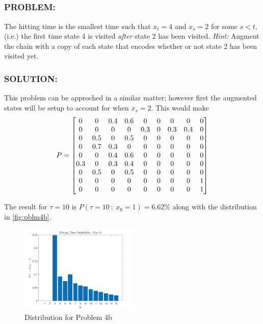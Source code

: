 \documentclass[]{article}
\newcommand{\Problem}{\subsubsection*{\textbf{PROBLEM:}}}
\newcommand{\Solution}{\subsubsection*{\textbf{SOLUTION:}}}
\newcommand{\st}{\ : \ }
\begin{document}
\subsection{}
\Problem
The hitting time is the smallest time such that $x_t = 4$ and $x_s = 2$ for some $s < t$, (i.e.) the first time state 4 is visited \emph{after} state 2 has been visited.
\emph{Hint:} Augment the chain with a copy of each state that encodes whether or not state 2 has been visited yet.
\Solution
This problem can be approched in a similar matter; however first the augmented states will be setup to account for when $x_s = 2$.
This would make \[
    P = \mqty[
        0   & 0   & 0.4 & 0.6 & 0   & 0 & 0   & 0   & 0 \\
        0   & 0   & 0   & 0   & 0.3 & 0 & 0.3 & 0.4 & 0 \\
        0   & 0.5 & 0   & 0.5 & 0   & 0 & 0   & 0   & 0 \\
        0   & 0.7 & 0.3 & 0   & 0   & 0 & 0   & 0   & 0 \\
        0   & 0   & 0.4 & 0.6 & 0   & 0 & 0   & 0   & 0 \\
        0.3 & 0   & 0.3 & 0.4 & 0   & 0 & 0   & 0   & 0 \\
        0   & 0.5 & 0   & 0.5 & 0   & 0 & 0   & 0   & 0 \\
        0   & 0   & 0   & 0   & 0   & 0 & 0   & 0   & 1 \\
        0   & 0   & 0   & 0   & 0   & 0 & 0   & 0   & 1
    ]
\]

The result for $\tau = 10$ is $P(\tau = 10 \st x_0 = 1) = 6.62\%$
along with the distribution in \autoref{fig:pblm4b}.
\begin{figure}[h]
    \centering
    \includegraphics[width = 0.5\textwidth]{figs/pblm4b.png}
    \caption{Distribution for Problem 4b}
    \label{fig:pblm4b}
\end{figure}



\newpage


% 
% 
\end{document}
